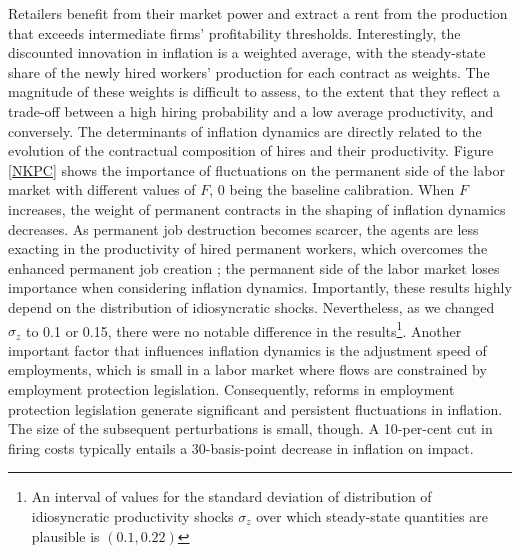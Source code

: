 Retailers benefit from their market power and extract a rent from the production that exceeds intermediate firms' profitability thresholds. Interestingly, the discounted innovation in inflation is a weighted average, with the steady-state share of the newly hired workers' production for each contract as weights. The magnitude of these weights is difficult to assess, to the extent that they reflect a trade-off between a high hiring probability and a low average productivity, and conversely. The determinants of inflation dynamics are directly related to the evolution of the contractual composition of hires and their productivity. Figure \ref{NKPC} shows the importance of fluctuations on the permanent side of the labor market with different values of $F$, 0 being the baseline calibration. When $F$ increases, the weight of permanent contracts in the shaping of inflation dynamics decreases. As permanent job destruction becomes scarcer, the agents are less exacting in the productivity of hired permanent workers, which overcomes the enhanced permanent job creation ; the permanent side of the labor market loses importance when considering inflation dynamics. Importantly, these results highly depend on the distribution of idiosyncratic shocks. Nevertheless, as we changed $\sigma_z$ to 0.1 or 0.15, there were no notable difference in the results\footnote{An interval of values for the standard deviation of distribution of idiosyncratic productivity shocks $\sigma_z$ over which steady-state quantities are plausible is $( 0.1 , 0.22 )$}. Another important factor that influences inflation dynamics is the adjustment speed of employments, which is small in a labor market where flows are constrained by employment protection legislation. Consequently, reforms in employment protection legislation generate significant and persistent fluctuations in inflation. The size of the subsequent perturbations is small, though. A 10-per-cent cut in firing costs typically entails a 30-basis-point decrease in inflation on impact.